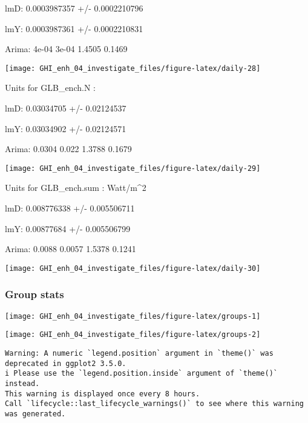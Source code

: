 \documentclass[
  10pt,
  a4paper,oneside]{article}
\begin{document}
lmD: 0.0003987357 +/- 0.0002210796

lmY: 0.0003987361 +/- 0.0002210831

Arima: 4e-04 3e-04 1.4505 0.1469

\begin{center}\texttt{[image: GHI\_enh\_04\_investigate\_files/figure-latex/daily-28]} \end{center}

Units for GLB\_ench.N :

lmD: 0.03034705 +/- 0.02124537

lmY: 0.03034902 +/- 0.02124571

Arima: 0.0304 0.022 1.3788 0.1679

\begin{center}\texttt{[image: GHI\_enh\_04\_investigate\_files/figure-latex/daily-29]} \end{center}

Units for GLB\_ench.sum : Watt/m\^{}2

lmD: 0.008776338 +/- 0.005506711

lmY: 0.00877684 +/- 0.005506799

Arima: 0.0088 0.0057 1.5378 0.1241

\begin{center}\texttt{[image: GHI\_enh\_04\_investigate\_files/figure-latex/daily-30]} \end{center}

\newpage
\FloatBarrier

\hypertarget{group-stats}{%
\subsubsection{Group stats}\label{group-stats}}

\begin{center}\texttt{[image: GHI\_enh\_04\_investigate\_files/figure-latex/groups-1]} \end{center}

\begin{center}\texttt{[image: GHI\_enh\_04\_investigate\_files/figure-latex/groups-2]} \end{center}

\begin{verbatim}
Warning: A numeric `legend.position` argument in `theme()` was deprecated in ggplot2 3.5.0.
i Please use the `legend.position.inside` argument of `theme()` instead.
This warning is displayed once every 8 hours.
Call `lifecycle::last_lifecycle_warnings()` to see where this warning was generated.
\end{verbatim}
\end{document}
